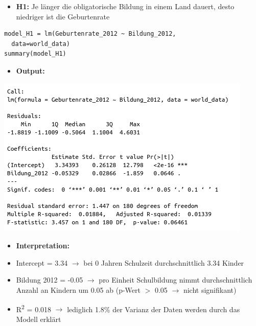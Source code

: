 \documentclass[aspectratio=169, journal, x11names, unknownkeysallowed, hyperref={colorlinks,
linkcolor = SS2,
urlcolor  = F3,
citecolor = F3,
anchorcolor = A4}, 12pt]{beamer}
\newcommand{\oarrow}{\textcolor{A1}{$\rightarrow$} }
\begin{document}
  \begin{frame}[t, fragile]
    \begin{minipage}[t]{0.45\textwidth}
        \begin{itemize}
            \item[] \textbf{H1:} Je länger die obligatorische Bildung in einem Land dauert, desto niedriger ist die Geburtenrate
          \end{itemize}
\begin{lstlisting}
model_H1 = lm(Geburtenrate_2012 ~ Bildung_2012, 
  data=world_data)
summary(model_H1)
\end{lstlisting} 
      \end{minipage}
      \begin{minipage}[t]{0.45\textwidth}
        \begin{itemize}
          \item[] \textbf{Output:}
        \end{itemize}
        \begin{center}
          \includegraphics[scale=0.3]{../Plots/summary_H1.png}
        \end{center}
        \vspace{-1em}
        \scriptsize
        \begin{itemize}[<+(-1)->]
          \item[] \textbf{Interpretation:}
          \item Intercept  = 3.34 \oarrow bei 0 Jahren Schulzeit durchschnittlich 3.34 Kinder 
          \item Bildung 2012 = -0.05 \oarrow pro Einheit Schulbildung nimmt durchschnittlich Anzahl an Kindern um 0.05 ab (p-Wert $ >$ 0.05 \oarrow nicht signifikant)
          \item R\textsuperscript{2} = 0.018 \oarrow lediglich 1.8\% der Varianz der Daten werden durch das Modell erklärt
        \end{itemize}
      \end{minipage}
  \end{frame}
\end{document}
